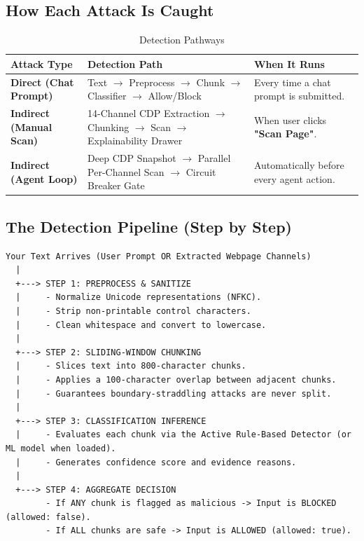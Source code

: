 \documentclass[11pt,a4paper]{article}
\begin{document}
\subsection{How Each Attack Is Caught}

\begin{table}[H]
\centering
\small
\begin{tabularx}{\textwidth}{BXX}
\toprule
\textbf{Attack Type} & \textbf{Detection Path} & \textbf{When It Runs} \\
\midrule
\textbf{Direct (Chat Prompt)} & Text $\rightarrow$ Preprocess $\rightarrow$ Chunk $\rightarrow$ Classifier $\rightarrow$ Allow/Block & Every time a chat prompt is submitted. \\
\textbf{Indirect (Manual Scan)} & 14-Channel CDP Extraction $\rightarrow$ Chunking $\rightarrow$ Scan $\rightarrow$ Explainability Drawer & When user clicks \textbf{"Scan Page"}. \\
\textbf{Indirect (Agent Loop)} & Deep CDP Snapshot $\rightarrow$ Parallel Per-Channel Scan $\rightarrow$ Circuit Breaker Gate & Automatically before every agent action. \\
\bottomrule
\end{tabularx}
\caption{Detection Pathways}
\end{table}

\subsection{The Detection Pipeline (Step by Step)}

\begin{lstlisting}
Your Text Arrives (User Prompt OR Extracted Webpage Channels)
  |
  +---> STEP 1: PREPROCESS & SANITIZE
  |     - Normalize Unicode representations (NFKC).
  |     - Strip non-printable control characters.
  |     - Clean whitespace and convert to lowercase.
  |
  +---> STEP 2: SLIDING-WINDOW CHUNKING
  |     - Slices text into 800-character chunks.
  |     - Applies a 100-character overlap between adjacent chunks.
  |     - Guarantees boundary-straddling attacks are never split.
  |
  +---> STEP 3: CLASSIFICATION INFERENCE
  |     - Evaluates each chunk via the Active Rule-Based Detector (or ML model when loaded).
  |     - Generates confidence score and evidence reasons.
  |
  +---> STEP 4: AGGREGATE DECISION
        - If ANY chunk is flagged as malicious -> Input is BLOCKED (allowed: false).
        - If ALL chunks are safe -> Input is ALLOWED (allowed: true).
\end{lstlisting}
\end{document}
